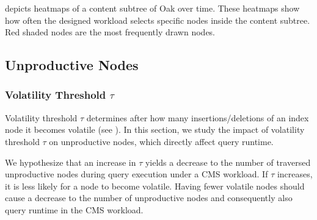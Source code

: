 \documentclass[abstracton,12pt]{scrartcl}
\theoremstyle{definition}
\begin{document}
 depicts heatmaps of a content subtree of Oak over time.
These heatmaps show how often the designed workload selects specific nodes
inside the content subtree. Red shaded nodes are the most frequently drawn nodes.





\vspace{-0.3cm}

\subsection{Unproductive Nodes}

\label{sec:unproductive-nodes-experiment}

\subsubsection{Volatility Threshold $\tau$}

\label{sec:threshold}

Volatility threshold $\tau$ determines after how many insertions/deletions of an index node
it becomes volatile (see ). In this section, we study the impact of
volatility threshold $\tau$ on unproductive nodes, which directly affect query runtime.

We hypothesize that an increase in $\tau$ yields a decrease to the number of
traversed unproductive nodes during query execution under a CMS workload. If
$\tau$ increases, it is
less likely for a node to become volatile. Having fewer volatile nodes should
cause a decrease to the number of unproductive nodes and consequently also query
runtime in the CMS workload.
\end{document}
